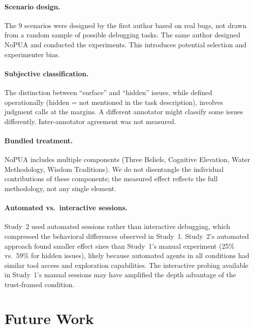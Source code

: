 \documentclass[11pt]{article}
\begin{document}
\paragraph{Scenario design.} The 9 scenarios were designed by the first author based on real bugs, not drawn from a random sample of possible debugging tasks. The same author designed NoPUA and conducted the experiments. This introduces potential selection and experimenter bias.

\paragraph{Subjective classification.} The distinction between ``surface'' and ``hidden'' issues, while defined operationally (hidden = not mentioned in the task description), involves judgment calls at the margins. A different annotator might classify some issues differently. Inter-annotator agreement was not measured.

\paragraph{Bundled treatment.} NoPUA includes multiple components (Three Beliefs, Cognitive Elevation, Water Methodology, Wisdom Traditions). We do not disentangle the individual contributions of these components; the measured effect reflects the full methodology, not any single element.

\paragraph{Automated vs.\ interactive sessions.} Study~2 used automated sessions rather than interactive debugging, which compressed the behavioral differences observed in Study~1. Study~2's automated approach found smaller effect sizes than Study~1's manual experiment (25\% vs.\ 59\% for hidden issues), likely because automated agents in all conditions had similar tool access and exploration capabilities. The interactive probing available in Study~1's manual sessions may have amplified the depth advantage of the trust-framed condition.

\section{Future Work}
\end{document}
